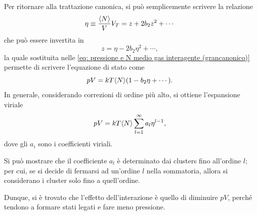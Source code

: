 Per ritornare alla trattazione canonica, si può semplicemente scrivere la relazione
\begin{equation}
    \eta \equiv \frac{\langle N \rangle}{V}V_T = z + 2b_2z^2 + \cdots
\end{equation}
che può essere invertita in
\begin{equation}
    z = \eta - 2b_2\eta^2 + \cdots,
\end{equation}
la quale sostituita nelle \eqref{eq: pressione e N medio gas interagente (grancanonico)} permette di scrivere l'equazione di stato come
\begin{equation}
    pV = kT\langle N \rangle(1 - b_2\eta + \cdots).
\end{equation}
In generale, considerando correzioni di ordine più alto, si ottiene l'espansione viriale
\begin{equation}
\label{eq: equazione di stato (espansione viriale)}
    pV = kT\langle N \rangle\sum_{l=1}^\infty a_l\eta^{l-1},
\end{equation}
dove gli $a_i$ sono i coefficienti viriali.
\begin{obs}
    Si può mostrare che il coefficiente $a_l$ è determinato dai clusters fino all'ordine $l$; per cui, se si decide di fermarsi ad un'ordine $l$ nella sommatoria, allora si considerano i cluster solo fino a quell'ordine.
\end{obs}
Dunque, si è trovato che l'effetto dell'interazione è quello di diminuire $pV$, perché tendono a formare stati legati e fare meno pressione. 

